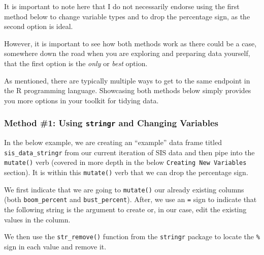 \documentclass[
  letterpaper,
]{krantz}
\begin{document}
\begin{tcolorbox}[enhanced jigsaw, colback=white, leftrule=.75mm, breakable, colframe=quarto-callout-note-color-frame, bottomtitle=1mm, rightrule=.15mm, left=2mm, opacityback=0, bottomrule=.15mm, arc=.35mm, coltitle=black, colbacktitle=quarto-callout-note-color!10!white, toptitle=1mm, titlerule=0mm, title=\textcolor{quarto-callout-note-color}{\faInfo}\hspace{0.5em}{Note}, toprule=.15mm, opacitybacktitle=0.6]

It is important to note here that I do not necessarily endorse using the
first method below to change variable types and to drop the percentage
sign, as the second option is ideal.

However, it is important to see how both methods work as there could be
a case, somewhere down the road when you are exploring and preparing
data yourself, that the first option is the \emph{only} or \emph{best}
option.

As mentioned, there are typically multiple ways to get to the same
endpoint in the R programming language. Showcasing both methods below
simply provides you more options in your toolkit for tidying data.

\end{tcolorbox}

\hypertarget{method-1-using-stringr-and-changing-variables}{%
\subsubsection{\texorpdfstring{Method \#1: Using \texttt{stringr} and
Changing
Variables}{Method \#1: Using stringr and Changing Variables}}\label{method-1-using-stringr-and-changing-variables}}

In the below example, we are creating an ``example'' data frame titled
\texttt{sis\_data\_stringr} from our current iteration of SIS data and
then pipe into the \texttt{mutate()} verb (covered in more depth in the
below \texttt{Creating\ New\ Variables} section). It is within this
\texttt{mutate()} verb that we can drop the percentage sign.

We first indicate that we are going to \texttt{mutate()} our already
existing columns (both \texttt{boom\_percent} and
\texttt{bust\_percent}). After, we use an \texttt{=} sign to indicate
that the following string is the argument to create or, in our case,
edit the existing values in the column.

We then use the \texttt{str\_remove()} function from the
\texttt{stringr} package to locate the \texttt{\%} sign in each value
and remove it.
\end{document}
